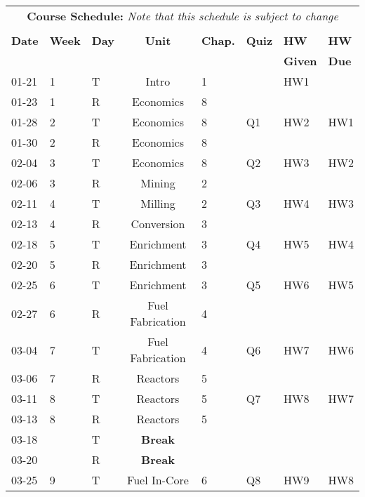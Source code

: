 \documentclass[11pt, a4paper]{article}
\begin{document}
\pagebreak
\FloatBarrier
\renewcommand{\arraystretch}{1}
\begin{table}[h]
\begin{center}
\begin{tabular}{lllcllll}
\multicolumn{8}{c}{\textbf{Course Schedule:}\textit{ Note that this schedule is subject to change}}\\
&&&&&&&\\
\textbf{Date} & \textbf{Week} & \textbf{Day} & \textbf{Unit} & \textbf{Chap.} & \textbf{Quiz} & \textbf{HW} & \textbf{HW}\\
 &  &  &  &  &                                                                                          & \textbf{Given} & \textbf{Due}\\
\hline
\hline
01-21 & 1 & T & Intro      & 1 &           &  HW1 &    \\
01-23 & 1 & R & Economics  & 8 &           &      &    \\
01-28 & 2 & T & Economics  & 8 &        Q1 &  HW2 & HW1\\
01-30 & 2 & R & Economics  & 8 &           &      &    \\
02-04 & 3 & T & Economics  & 8 &        Q2 &  HW3 & HW2\\
02-06 & 3 & R & Mining     & 2 &           &      &    \\
02-11 & 4 & T & Milling    & 2 &        Q3 &  HW4 & HW3\\
02-13 & 4 & R & Conversion & 3 &           &      &    \\
02-18 & 5 & T & Enrichment & 3 &        Q4 &  HW5 & HW4\\
02-20 & 5 & R & Enrichment & 3 &           &      &    \\
02-25 & 6 & T & Enrichment & 3 &        Q5 &  HW6 & HW5\\
02-27 & 6 & R & Fuel Fabrication & 4 &     &      &    \\
03-04 & 7 & T & Fuel Fabrication & 4 &  Q6 &  HW7 & HW6\\
03-06 & 7 & R & Reactors & 5 &             &      &    \\
03-11 & 8 & T & Reactors & 5 &          Q7 &  HW8 & HW7\\
03-13 & 8 & R & Reactors & 5 &             &      &    \\
03-18 &   & T & \textbf{Break} &  &   &      &    \\
03-20 &   & R & \textbf{Break} &  &   &      &    \\
03-25 & 9 & T & Fuel In-Core & 6 &     Q8 &  HW9 & HW8 \\

\end{tabular}
\end{center}
\end{table}
\end{document}
